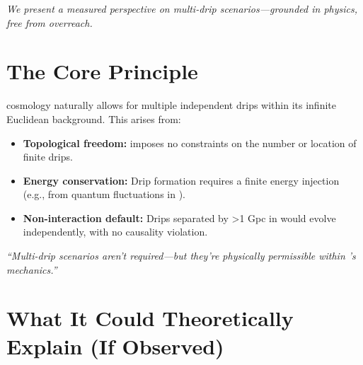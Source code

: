 \documentclass{BSpacePaper} %
\begin{document}
\makeBSCSsupplementtitle

\begin{center}
    \textit{We present a measured perspective on multi-drip scenarios—grounded in physics, free from overreach.}
\end{center}
\vspace{1em}

\section{The Core Principle}
\bspace{} cosmology naturally allows for multiple independent drips within its infinite Euclidean background. This arises from:
\begin{itemize}
    \item \textbf{Topological freedom:} \bspace{} imposes no constraints on the number or location of finite drips.
    \item \textbf{Energy conservation:} Drip formation requires a finite energy injection (e.g., from quantum fluctuations in \bspace{}).
    \item \textbf{Non-interaction default:} Drips separated by >1 Gpc in \bspace{} would evolve independently, with no causality violation.
\end{itemize}
\begin{center}
    \textit{``Multi-drip scenarios aren’t required—but they’re physically permissible within \bspace{}’s mechanics.''}
\end{center}

\section{What It Could Theoretically Explain (If Observed)}
\end{document}
